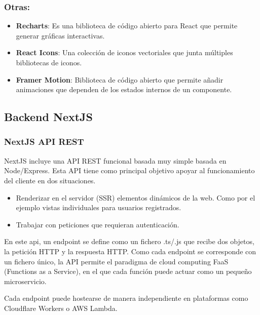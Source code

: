 \hypertarget{otras}{%
\subsubsection{Otras:}\label{otras}}

\begin{itemize}
\item
  \textbf{Recharts}: Es una biblioteca de código abierto para React que
  permite generar gráficas interactivas.
\item
  \textbf{React Icons}: Una colección de iconos vectoriales que junta
  múltiples bibliotecas de iconos.
\item
  \textbf{Framer Motion}: Biblioteca de código abierto que permite
  añadir animaciones que dependen de los estados internos de un
  componente.
\end{itemize}

\hypertarget{backend-nextjs}{%
\subsection{Backend NextJS}\label{backend-nextjs}}

\hypertarget{nextjs-api-rest}{%
\subsubsection{NextJS API REST}\label{nextjs-api-rest}}

NextJS incluye una API REST funcional basada muy simple basada en
Node/Express. Esta API tiene como principal objetivo apoyar al
funcionamiento del cliente en dos situaciones.

\begin{itemize}
\item
  Renderizar en el servidor (SSR) elementos dinámicos de la web. Como
  por el ejemplo vistas individuales para usuarios registrados.
\item
  Trabajar con peticiones que requieran autenticación.
\end{itemize}

En este api, un endpoint se define como un fichero .ts/.js que recibe
dos objetos, la petición HTTP y la respuesta HTTP. Como cada endpoint se
corresponde con un fichero único, la API permite el paradigma de cloud
computing FaaS (Functions as a Service), en el que cada función puede
actuar como un pequeño microservicio.

Cada endpoint puede hostearse de manera independiente en plataformas
como Cloudflare Workers o AWS Lambda.

